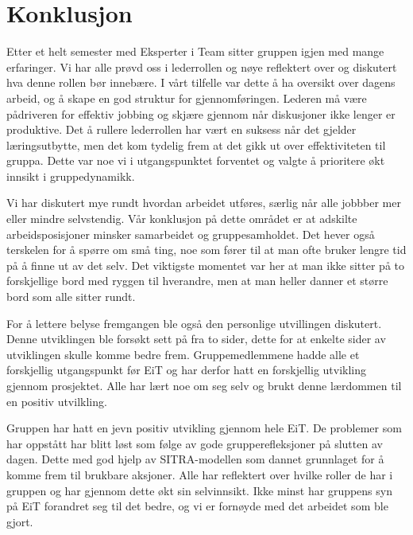 \chapter{Konklusjon}

Etter et helt semester med Eksperter i Team sitter gruppen igjen med mange erfaringer. 
Vi har alle prøvd oss i lederrollen og nøye reflektert over og diskutert hva denne rollen bør innebære. 
I vårt tilfelle var dette å ha oversikt over dagens arbeid, og å skape en god struktur for gjennomføringen. 
Lederen må være pådriveren for effektiv jobbing og skjære gjennom når diskusjoner ikke lenger er produktive. 
Det å rullere lederrollen har vært en suksess når det gjelder læringsutbytte, men det kom tydelig frem at det gikk ut over effektiviteten til gruppa. 
Dette var noe vi i utgangspunktet forventet og valgte å prioritere økt innsikt i gruppedynamikk.
\vspace{\secspace}

Vi har diskutert mye rundt hvordan arbeidet utføres, særlig når alle jobbber mer eller mindre selvstendig. 
Vår konklusjon på dette området er at adskilte arbeidsposisjoner minsker samarbeidet og gruppesamholdet.
Det hever også terskelen for å spørre om små ting, noe som fører til at man ofte bruker lengre tid på å finne ut av det selv.
Det viktigste momentet var her at man ikke sitter på to forskjellige bord med ryggen til hverandre, men at man heller danner et større bord som alle sitter rundt.
\vspace{\secspace}

For å lettere belyse fremgangen ble også den personlige utvillingen diskutert. 
Denne utviklingen ble forsøkt sett på fra to sider, dette for at enkelte sider av utviklingen skulle komme bedre frem.
Gruppemedlemmene hadde alle et forskjellig utgangspunkt før EiT og har derfor hatt en forskjellig utvikling gjennom prosjektet. 
Alle har lært noe om seg selv og brukt denne lærdommen til en positiv utvilkling.
\vspace{\secspace}

Gruppen har hatt en jevn positiv utvikling gjennom hele EiT. 
De problemer som har oppstått har blitt løst som følge av gode grupperefleksjoner på slutten av dagen. 
Dette med god hjelp av SITRA-modellen som dannet grunnlaget for å komme frem til brukbare aksjoner. 
Alle har reflektert over hvilke roller de har i gruppen og har gjennom dette økt sin selvinnsikt.
Ikke minst har gruppens syn på EiT forandret seg til det bedre, og vi er fornøyde med det arbeidet som ble gjort. 
